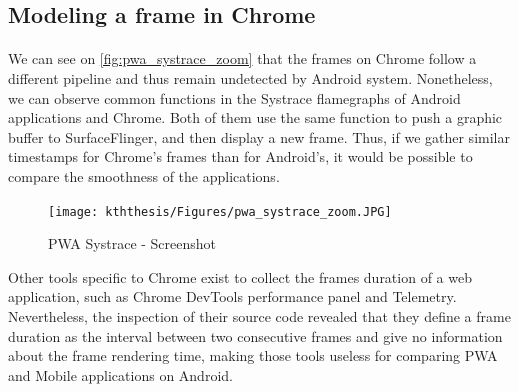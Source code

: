     
    
    \subsection{Modeling a frame in Chrome}
    
    \paragraph{}
    We can see on \autoref{fig:pwa_systrace_zoom} that the frames on Chrome follow a different pipeline and thus remain undetected by Android system. Nonetheless, we can observe common functions in the Systrace flamegraphs of Android applications and Chrome. Both of them use the same function to push a graphic buffer to SurfaceFlinger, and then display a new frame. Thus, if we gather similar timestamps for Chrome's frames than for Android's, it would be possible to compare the smoothness of the applications.
    
    
    
    \begin{figure}[h]
        \centering
        \texttt{[image: kththesis/Figures/pwa\_systrace\_zoom.JPG]}
        \caption{PWA Systrace - Screenshot}
        \label{fig:pwa_systrace_zoom}
    \end{figure}
    
    Other tools specific to Chrome exist to collect the frames duration of a web application, such as Chrome DevTools performance panel and Telemetry. Nevertheless, the inspection of their source code revealed that they define a frame duration as the interval between two consecutive frames and give no information about the frame rendering time, making those tools useless for comparing PWA and Mobile applications on Android.
    
